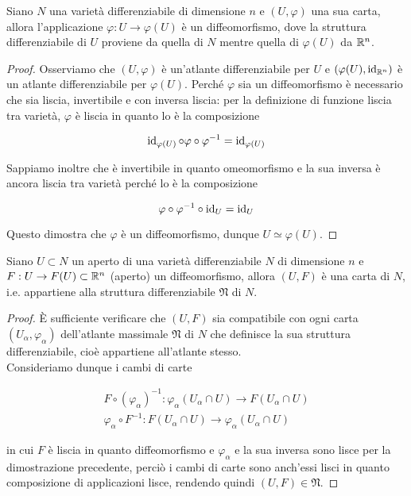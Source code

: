 \begin{definition}
	Siano $ N $ una varietà differenziabile di dimensione $ n $ e $ (U,\varphi) $ una sua carta, allora l'applicazione $ \varphi : U \to \varphi(U) $ è un diffeomorfismo, dove la struttura differenziabile di $ U $ proviene da quella di $ N $ mentre quella di $ \varphi(U) $ da $ \mathbb{R}^{n} $.
\end{definition}

\begin{proof}
	Osserviamo che $ (U,\varphi) $ è un'atlante differenziabile per $ U $ e $ (\varphi(U),\operatorname{id}_{\mathbb{R}^{n}}) $ è un atlante differenziabile per $ \varphi(U) $. Perché $ \varphi $ sia un diffeomorfismo è necessario che sia liscia, invertibile e con inversa liscia: per la definizione di funzione liscia tra varietà, $ \varphi $ è liscia in quanto lo è la composizione
	
	\begin{equation}
		\operatorname{id}_{\varphi(U)} \circ \varphi \circ \varphi^{-1} = \operatorname{id}_{\varphi(U)}
	\end{equation}

	Sappiamo inoltre che è invertibile in quanto omeomorfismo e la sua inversa è ancora liscia tra varietà perché lo è la composizione
	
	\begin{equation}
		\varphi \circ \varphi^{-1} \circ \operatorname{id}_{U} = \operatorname{id}_{U}
	\end{equation}

	Questo dimostra che $ \varphi $ è un diffeomorfismo, dunque $ U \simeq \varphi(U) $.
\end{proof}

\begin{definition}\label{prop:diffeo-map}
	Siano $ U \subset N $ un aperto di una varietà differenziabile $ N $ di dimensione $ n $ e $ F : U \to F(U) \subset \mathbb{R}^{n} $ (aperto) un diffeomorfismo, allora $ (U,F) $ è una carta di $ N $, i.e. appartiene alla struttura differenziabile $ \mathfrak{N} $ di $ N $.
\end{definition}

\begin{proof}
	È sufficiente verificare che $ (U,F) $ sia compatibile con ogni carta $ (U_{\alpha},\varphi_{\alpha}) $ dell'atlante massimale $ \mathfrak{N} $ di $ N $ che definisce la sua struttura differenziabile, cioè appartiene all'atlante stesso. \\
	Consideriamo dunque i cambi di carte
	
	\begin{gather}
		F \circ (\varphi_{\alpha})^{-1} : \varphi_{\alpha}(U_{\alpha} \cap U) \to F(U_{\alpha} \cap U) \\
		\varphi_{\alpha} \circ F^{-1} : F(U_{\alpha} \cap U) \to \varphi_{\alpha}(U_{\alpha} \cap U)
	\end{gather}

	in cui $ F $ è liscia in quanto diffeomorfismo e $ \varphi_{\alpha} $ e la sua inversa sono lisce per la dimostrazione precedente, perciò i cambi di carte sono anch'essi lisci in quanto composizione di applicazioni lisce, rendendo quindi $ (U,F) \in \mathfrak{N} $.
\end{proof}

